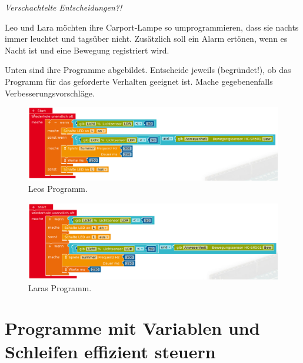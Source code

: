 \begin{aufgabe} \emph{Verschachtelte Entscheidungen?!}
	
	Leo und Lara möchten ihre Carport-Lampe so umprogrammieren, dass sie nachts immer leuchtet und tagsüber nicht. Zusätzlich soll ein Alarm ertönen, wenn es Nacht ist und eine Bewegung registriert wird.
	
	Unten sind ihre Programme abgebildet. Entscheide jeweils (begründet!), ob das Programm für das geforderte Verhalten geeignet ist. Mache gegebenenfalls Verbesserungsvorschläge.
	
	\bigskip
	\begin{figure}[H]
		\begin{adjustwidth*}{-1.5cm}{-1.5cm}
			\centering
			\includegraphics[width=1.2\textwidth]{./pics/wenn-sonstWenn-sonst-Bsp.png}
			\caption{Leos Programm.}
			\label{abb:sonstWenn1}
		\end{adjustwidth*}
	\end{figure}
	\begin{figure}[H]
		\begin{adjustwidth*}{-1.5cm}{-1.5cm}
			\centering
			\includegraphics[width=1.2\textwidth]{./pics/wenn-sonstWenn-sonst-Bsp2.png}
			\caption{Laras Programm.}
		\end{adjustwidth*}
	\end{figure}
\end{aufgabe}

\newpage
\section{Programme mit Variablen und Schleifen effizient steuern}
\label{sec:variablenUndSchleifen}

